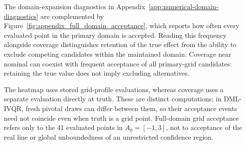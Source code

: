 The domain-expansion diagnostics in Appendix~\ref{app:numerical-domain-diagnostics} are complemented by Figure~\ref{fig:appendix_full_domain_acceptance}, which reports how often every evaluated point in the primary domain is accepted. Reading this frequency alongside coverage distinguishes retention of the true effect from the ability to exclude competing candidates within the maintained domain. Coverage near nominal can coexist with frequent acceptance of all primary-grid candidates: retaining the true value does not imply excluding alternatives.

The heatmap uses stored grid-profile evaluations, whereas coverage uses a separate evaluation directly at truth. These are distinct computations; in DML-IVQR, fresh pivotal draws can differ between them, so their acceptance events need not coincide even when truth is a grid point. Full-domain grid acceptance refers only to the 41 evaluated points in $A_0=[-1,3]$, not to acceptance of the real line or global unboundedness of an unrestricted confidence region.


\FloatBarrier
